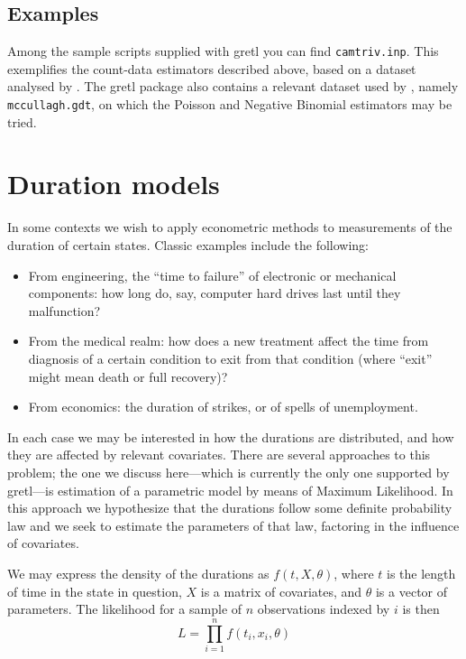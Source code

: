 \subsection{Examples}

Among the sample scripts supplied with gretl you can find
\texttt{camtriv.inp}. This exemplifies the count-data estimators
described above, based on a dataset analysed by
\cite{cameron-trivedi98}. The gretl package also contains a relevant
dataset used by \cite{mccullagh-nelder83}, namely
\texttt{mccullagh.gdt}, on which the Poisson and Negative Binomial
estimators may be tried.

\section{Duration models}
\label{sec:duration}

In some contexts we wish to apply econometric methods to measurements
of the duration of certain states. Classic examples include the
following:
\begin{itemize}
\item From engineering, the ``time to failure'' of electronic or
  mechanical components: how long do, say, computer hard drives
  last until they malfunction?
\item From the medical realm: how does a new treatment affect the
  time from diagnosis of a certain condition to exit from that
  condition (where ``exit'' might mean death or full recovery)?
\item From economics: the duration of strikes, or of spells of
  unemployment.
\end{itemize}

In each case we may be interested in how the durations are
distributed, and how they are affected by relevant covariates.  There
are several approaches to this problem; the one we discuss
here---which is currently the only one supported by gretl---is
estimation of a parametric model by means of Maximum Likelihood.  In
this approach we hypothesize that the durations follow some definite
probability law and we seek to estimate the parameters of that law,
factoring in the influence of covariates.

We may express the density of the durations as $f(t, X, \theta)$,
where $t$ is the length of time in the state in question, $X$ is a
matrix of covariates, and $\theta$ is a vector of parameters.  The
likelihood for a sample of $n$ observations indexed by $i$ is then
\[
L = \prod_{i=1}^n f(t_i, x_i, \theta)
\]

